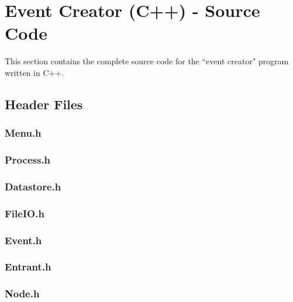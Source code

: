 \documentclass[a4paper, 10pt]{article}
\begin{document}
\clearpage

\section{Event Creator (C++) - Source Code}

This section contains the complete source code for the ``event creator" program written in C++.

\subsection{Header Files}

\subsubsection{Menu.h}


\clearpage
\subsubsection{Process.h}


\clearpage
\subsubsection{Datastore.h}


\clearpage
\subsubsection{FileIO.h}


\clearpage
\subsubsection{Event.h}


\clearpage
\subsubsection{Entrant.h}


\clearpage
\subsubsection{Node.h}

\end{document}
